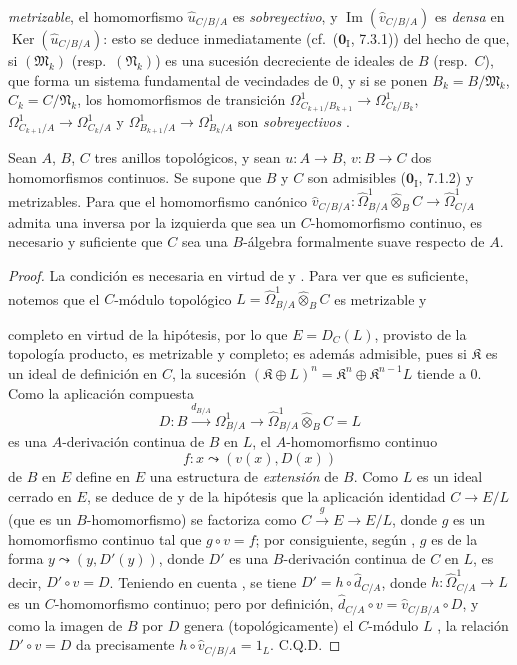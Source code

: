 \begin{env}[20.7.17]
\emph{metrizable}, el homomorfismo $\widehat u_{C/B/A}$ es \emph{sobreyectivo},
y $\operatorname{Im}(\widehat v_{C/B/A})$ es \emph{densa} en
$\operatorname{Ker}(\widehat u_{C/B/A})$: esto se deduce inmediatamente
(cf.\ ($\mathbf{0}_{\mathrm I}$, 7.3.1)) del hecho de que, si
$(\mathfrak{M}_k)$ (resp.\ $(\mathfrak{N}_k)$) es una sucesión decreciente
de ideales de $B$ (resp.\ $C$), que forma un sistema fundamental de vecindades
de $0$, y si se ponen $B_k=B/\mathfrak{M}_k$, $C_k=C/\mathfrak{N}_k$, los
homomorfismos de transición
$\Omega^1_{C_{k+1}/B_{k+1}}\to\Omega^1_{C_k/B_k}$,
$\Omega^1_{C_{k+1}/A}\to\Omega^1_{C_k/A}$ y
$\Omega^1_{B_{k+1}/A}\to\Omega^1_{B_k/A}$ son \emph{sobreyectivos}
.
\end{env}

\begin{proposition}[20.7.18]
\label{0.20.7.18-fr}
Sean $A$, $B$, $C$ tres anillos topológicos, y sean $u:A\to B$, $v:B\to C$
dos homomorfismos continuos. Se supone que $B$ y $C$ son admisibles
\textup{($\mathbf{0}_{\mathrm I}$, 7.1.2)} y metrizables. Para que el homomorfismo
canónico
$\widehat v_{C/B/A}:\widehat{\Omega}^1_{B/A}\widehat\otimes_B C\to\widehat{\Omega}^1_{C/A}$
admita una inversa por la izquierda que sea un $C$-homomorfismo continuo, es
necesario y suficiente que $C$ sea una $B$-álgebra formalmente suave respecto
de $A$.
\end{proposition}

\begin{proof}
La condición es necesaria en virtud de  y
. Para ver que es suficiente, notemos que el $C$-módulo
topológico
$L=\widehat{\Omega}^1_{B/A}\widehat\otimes_B C$ es
metrizable y

completo en virtud de la hipótesis, por lo que
$E=D_C(L)$, provisto de la topología producto, es 
metrizable y completo; es
además admisible, pues si $\mathfrak{K}$ es un ideal de definición en $C$, la
sucesión $(\mathfrak{K}\oplus L)^n=\mathfrak{K}^n\oplus\mathfrak{K}^{n-1}L$
tiende a $0$. Como la aplicación compuesta
\[
  D:B\xrightarrow{d_{B/A}}\Omega^1_{B/A}\to
  \widehat{\Omega}^1_{B/A}\widehat\otimes_B C=L
\]
es una $A$-derivación continua de $B$ en $L$, el $A$-homomorfismo continuo
\[
  f:x\leadsto(v(x),D(x))
\]
de $B$ en $E$ define en $E$ una estructura de \emph{extensión} de $B$. Como $L$ es
un ideal cerrado en $E$, se deduce de  y de la hipótesis que
la aplicación identidad $C\to E/L$ (que es un $B$-homomorfismo) se factoriza
como $C\xrightarrow{g}E\to E/L$, donde $g$ es un homomorfismo continuo tal
que $g\circ v=f$; por consiguiente, según , $g$ es de la
forma $y\leadsto(y,D'(y))$, donde $D'$ es una $B$-derivación continua de $C$ en
$L$, es decir, $D'\circ v=D$. Teniendo en cuenta , se
tiene $D'=h\circ\widehat d_{C/A}$, donde
$h:\widehat{\Omega}^1_{C/A}\to L$ es un $C$-homomorfismo continuo; pero por
definición, $\widehat d_{C/A}\circ v=\widehat v_{C/B/A}\circ D$, y como la
imagen de $B$ por $D$ genera (topológicamente) el $C$-módulo $L$
, la relación $D'\circ v=D$ da precisamente
$h\circ\widehat v_{C/B/A}=1_L$. C.Q.D.
\end{proof}

